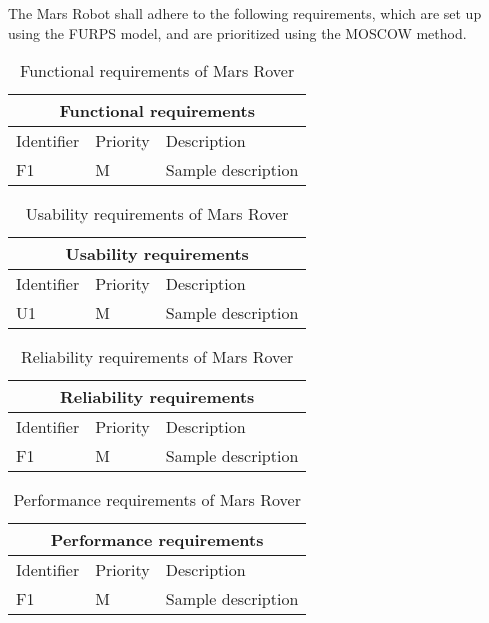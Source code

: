 The Mars Robot shall adhere to the following requirements, which are set up
using the FURPS model, and are prioritized using the MOSCOW method.

\begin{table}[H]
	\centering
	\begin{tabular}{|l|l|l|}
		\hline
		\multicolumn{3}{|c|}{Functional requirements} \\  \hline
		\hline
		Identifier & Priority & Description \\  
		\hline
		\hline
		F1 & M & Sample description \\  
		\hline
	\end{tabular}
\caption{Functional requirements of Mars Rover}
\label{tbl:functionalReq}
\end{table}

\begin{table}[H]
	\centering
	\begin{tabular}{|l|l|l|}
		\hline
		\multicolumn{3}{|c|}{Usability requirements} \\  \hline
		\hline
		Identifier & Priority & Description \\  
		\hline
		\hline
		U1 & M & Sample description \\  
		\hline
	\end{tabular}
\caption{Usability requirements of Mars Rover}
\label{tbl:usabilityReq}
\end{table}

\begin{table}[H]
	\centering
	\begin{tabular}{|l|l|l|}
		\hline
		\multicolumn{3}{|c|}{Reliability requirements} \\  \hline
		\hline
		Identifier & Priority & Description \\  
		\hline
		\hline
		F1 & M & Sample description \\  
		\hline
	\end{tabular}
\caption{Reliability requirements of Mars Rover}
\label{tbl:reliabilityReq}
\end{table}

\begin{table}[H]
	\centering
	\begin{tabular}{|l|l|l|}
		\hline
		\multicolumn{3}{|c|}{Performance requirements} \\  \hline
		\hline
		Identifier & Priority & Description \\  
		\hline
		\hline
		F1 & M & Sample description \\  
		\hline
	\end{tabular}
\caption{Performance requirements of Mars Rover}
\label{tbl:performanceReq}
\end{table}


